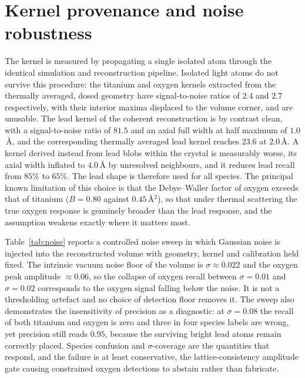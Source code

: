 \documentclass[aps,prb,twocolumn,superscriptaddress,floatfix,nofootinbib]{revtex4-2}
\begin{document}
\section{Kernel provenance and noise robustness}
\label{app:kernel}
\setcounter{table}{0}
\setcounter{figure}{0}

The kernel is measured by propagating a single isolated atom through the identical simulation
and reconstruction pipeline. Isolated light atoms do not survive this procedure: the titanium
and oxygen kernels extracted from the thermally averaged, dosed geometry have signal-to-noise
ratios of $2.4$ and $2.7$ respectively, with their interior maxima displaced to the volume
corner, and are unusable. The lead kernel of the coherent reconstruction is by contrast clean,
with a signal-to-noise ratio of $81.5$ and an axial full width at half maximum of $1.0$\,\AA,
and the corresponding thermally averaged lead kernel reaches $23.6$ at $2.0$\,\AA. A kernel
derived instead from lead blobs within the crystal is measurably worse, its axial width inflated
to $4.0$\,\AA{} by unresolved neighbours, and it reduces lead recall from $85\%$ to $65\%$. The
lead shape is therefore used for all species. The principal known limitation of this choice is
that the Debye--Waller factor of oxygen exceeds that of titanium ($B=0.80$ against
$0.45$\,\AA$^2$), so that under thermal scattering the true oxygen response is genuinely
broader than the lead response, and the assumption weakens exactly where it matters most.

Table~\ref{tab:noise} reports a controlled noise sweep in which Gaussian noise is injected into
the reconstructed volume with geometry, kernel and calibration held fixed. The intrinsic vacuum
noise floor of the volume is $\sigma\approx0.022$ and the oxygen peak amplitude
$\approx0.06$, so the collapse of oxygen recall between $\sigma=0.01$ and $\sigma=0.02$
corresponds to the oxygen signal falling below the noise. It is not a thresholding artefact and
no choice of detection floor removes it. The sweep also demonstrates the insensitivity of
precision as a diagnostic: at $\sigma=0.08$ the recall of both titanium and oxygen is zero and
three in four species labels are wrong, yet precision still reads $0.95$, because the surviving
bright lead atoms remain correctly placed. Species confusion and $\sigma$-coverage are the
quantities that respond, and the failure is at least conservative, the lattice-consistency
amplitude gate causing constrained oxygen detections to abstain rather than fabricate.
\end{document}
